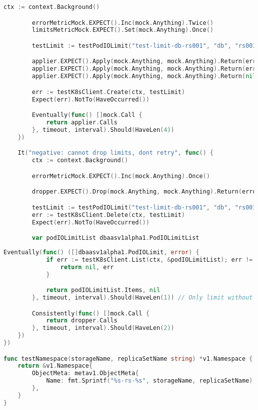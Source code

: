 \begin{appendices}
\begin{lstlisting}[language=Go,label=lst:int5, caption={Интеграционный тест (продолжение листинга~\ref{lst:int4})}]
		ctx := context.Background()

		errorMetricMock.EXPECT().Inc(mock.Anything).Twice()
		limitsMetricMock.EXPECT().Set(mock.Anything).Once()

		testLimit := testPodIOLimit("test-limit-db-rs001", "db", "rs001", 0)

		applier.EXPECT().Apply(mock.Anything, mock.Anything).Return(errors.New("some error")).Once()
		applier.EXPECT().Apply(mock.Anything, mock.Anything).Return(errors.New("some error")).Once()
		applier.EXPECT().Apply(mock.Anything, mock.Anything).Return(nil).Once()

		err := testK8sClient.Create(ctx, testLimit)
		Expect(err).NotTo(HaveOccurred())

		Eventually(func() []mock.Call {
			return applier.Calls
		}, timeout, interval).Should(HaveLen(4))
	})

	It("negative: cannot drop limits, dont retry", func() {
		ctx := context.Background()

		errorMetricMock.EXPECT().Inc(mock.Anything).Once()

		dropper.EXPECT().Drop(mock.Anything, mock.Anything).Return(errors.New("some error")).Once()

		testLimit := testPodIOLimit("test-limit-db-rs001", "db", "rs001", 0)
		err := testK8sClient.Delete(ctx, testLimit)
		Expect(err).NotTo(HaveOccurred())

		var podIOLimitList dbaasv1alpha1.PodIOLimitList
\end{lstlisting}

\begin{lstlisting}[language=Go,label=lst:int6, caption={Интеграционный тест (продолжение листинга~\ref{lst:int5})}]
		Eventually(func() ([]dbaasv1alpha1.PodIOLimit, error) {
			if err := testK8sClient.List(ctx, &podIOLimitList); err != nil {
				return nil, err
			}

			return podIOLimitList.Items, nil
		}, timeout, interval).Should(HaveLen(1)) // Only limit without pod.

		Consistently(func() []mock.Call {
			return dropper.Calls
		}, timeout, interval).Should(HaveLen(2))
	})
})

func testNamespace(storageName, replicaSetName string) *v1.Namespace {
	return &v1.Namespace{
		ObjectMeta: metav1.ObjectMeta{
			Name: fmt.Sprintf("%s-rs-%s", storageName, replicaSetName),
		},
	}
}


\end{lstlisting}
\end{appendices}
